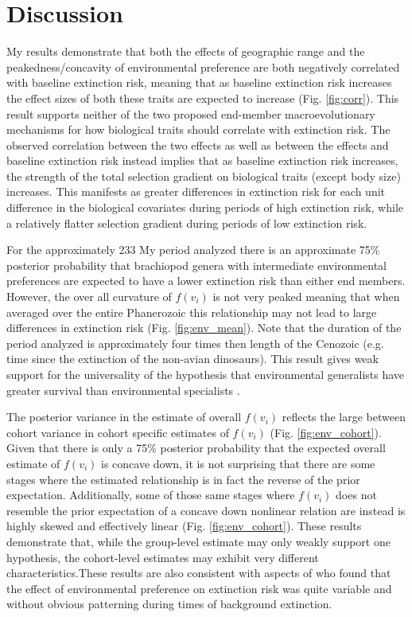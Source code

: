 \documentclass{article}
\begin{document}
\section{Discussion}

My results demonstrate that both the effects of geographic range and the peakedness/concavity of environmental preference are both negatively correlated with baseline extinction risk, meaning that as baseline extinction risk increases the effect sizes of both these traits are expected to increase (Fig. \ref{fig:corr}). This result supports neither of the two proposed end-member macroevolutionary mechanisms for how biological traits should correlate with extinction risk. The observed correlation between the two effects as well as between the effects and baseline extinction risk instead implies that as baseline extinction risk increases, the strength of the total selection gradient on biological traits (except body size) increases. This manifests as greater differences in extinction risk for each unit difference in the biological covariates during periods of high extinction risk, while a relatively flatter selection gradient during periods of low extinction risk.

For the approximately 233 My period analyzed there is an approximate 75\% posterior probability that brachiopod genera with intermediate environmental preferences are expected to have a lower extinction risk than either end members. However, the over all curvature of \(f(v_{i})\) is not very peaked meaning that when averaged over the entire Phanerozoic this relationship may not lead to large differences in extinction risk (Fig. \ref{fig:env_mean}). Note that the duration of the period analyzed is approximately four times then length of the Cenozoic (e.g. time since the extinction of the non-avian dinosaurs). This result gives weak support for the universality of the hypothesis that environmental generalists have greater survival than environmental specialists \citep{Simpson1944,Liow2004a,Liow2007b,Nurnberg2013a,Nurnberg2015}.

The posterior variance in the estimate of overall \(f(v_{i})\) reflects the large between cohort variance in cohort specific estimates of \(f(v_{i})\) (Fig. \ref{fig:env_cohort}). Given that there is only a 75\% posterior probability that the expected overall estimate of \(f(v_{i})\) is concave down, it is not surprising that there are some stages where the estimated relationship is in fact the reverse of the prior expectation. Additionally, some of those same stages where \(f(v_{i})\) does not resemble the prior expectation of a concave down nonlinear relation are instead is highly skewed and effectively linear (Fig. \ref{fig:env_cohort}). These results demonstrate that, while the group-level estimate may only weakly support one hypothesis, the cohort-level estimates may exhibit very different characteristics.These results are also consistent with aspects of \citet{Miller2009a} who found that the effect of environmental preference on extinction risk was quite variable and without obvious patterning during times of background extinction.
\end{document}
